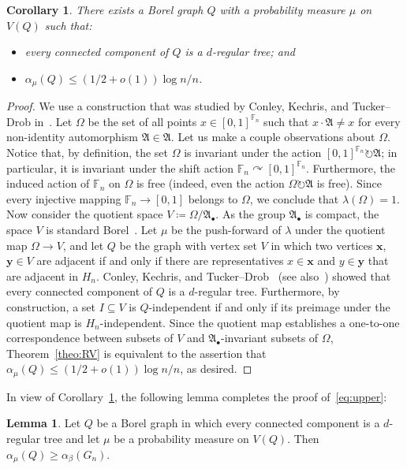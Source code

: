 \documentclass[10pt]{amsart}
\newtheorem{coro}[cdrthm]{Corollary}
\theoremstyle{definition}
\newtheorem{lemma}[cdrthm]{Lemma}
\newcommand{\0}{\varnothing}
\renewcommand{\leq}{\leqslant}
\renewcommand{\geq}{\geqslant}
\newcommand{\defeq}{\coloneqq}
\newcommand{\racts}{\circlearrowright}
\newcommand{\F}{\mathbb{F}}
\newcommand{\frkA}{\mathfrak{A}}
\begin{document}
\begin{coro}\label{corl:tree}
There exists a Borel graph $Q$ with a probability measure $\mu$ on $V(Q)$ such that:
\begin{itemize}
\item every connected component of $Q$ is a $d$-regular tree; and
\item $\alpha_\mu(Q) \leq (1/2 + o(1)) \log n/n$.
\end{itemize}
\end{coro}


\begin{proof}
We use a construction that was studied by Conley, Kechris, and Tucker--Drob in~\cite{Ultra}. Let $\Omega$ be the set of all points $x \in [0,1]^{\F_n}$ such that $x \cdot \frkA \neq x$ for every non-identity automorphism $\frkA \in \frkA$. Let us make a couple observations about $\Omega$. Notice that, by definition, the set $\Omega$ is invariant under the action $[0,1]^{\F_n} \racts \frkA$; in particular, it is invariant under the shift action $\F_n \curvearrowright [0,1]^{\F_n}$. Furthermore, the induced action of $\F_n$ on $\Omega$ is free (indeed, even the action $\Omega \racts \frkA$ is free). Since every injective mapping $\F_n \to [0,1]$ belongs to $\Omega$, we conclude that $\lambda(\Omega) = 1$. Now consider the quotient space $V
\defeq \Omega/\frkA_\bullet$. As the group $\frkA_\bullet$ is compact, the space $V$ is standard Borel~\cite[paragraph preceding Lemma~7.8]{Ultra}. Let $\mu$ be the push-forward of $\lambda$ under the quotient map $\Omega \to V$, and let $Q$ be the graph with vertex set $V$ in which two vertices $\bm{x}$, $\bm{y} \in V$ are adjacent if and only if there are representatives $x \in \bm{x}$ and $y \in \bm{y}$ that are adjacent in $H_n$. Conley, Kechris, and Tucker--Drob~\cite[Lemma~7.9]{Ultra} (see also~\cite[Proposition~1.9]{Thornton}) showed that every connected component of $Q$ is a $d$-regular tree. Furthermore, by construction, a set $I \subseteq V$ is $Q$-independent if and only if its preimage under the quotient map is $H_n$-independent. Since the quotient map establishes a one-to-one correspondence between subsets of $V$ and $\frkA_\bullet$-invariant subsets of $\Omega$, Theorem~\ref{theo:RV} is equivalent to the assertion that $\alpha_\mu(Q) \leq (1/2 + o(1)) \log n/n$, as desired.
\end{proof}

In view of Corollary~\ref{corl:tree}, the following lemma completes the proof of~\eqref{eq:upper}:

\begin{lemma}\label{lemma:AW}
Let $Q$ be a Borel graph in which every connected component is a $d$-regular tree and let $\mu$ be a probability measure on $V(Q)$. Then $\alpha_\mu(Q) \geq \alpha_\beta(G_n)$.
\end{lemma}
\end{document}
